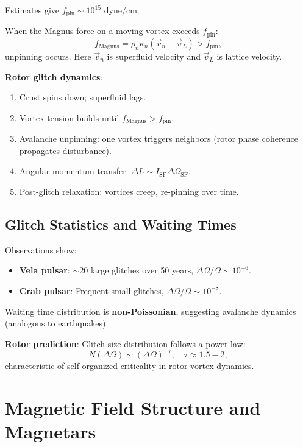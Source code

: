 \documentclass[12pt,a4paper]{article}
\theoremstyle{definition}
\theoremstyle{remark}
\begin{document}
Estimates give $f_{\text{pin}} \sim 10^{15}$ dyne/cm.

When the Magnus force on a moving vortex exceeds $f_{\text{pin}}$:
\begin{equation}
f_{\text{Magnus}} = \rho_n \kappa_n (\vec{v}_n - \vec{v}_L) > f_{\text{pin}},
\end{equation}
unpinning occurs. Here $\vec{v}_n$ is superfluid velocity and $\vec{v}_L$ is lattice velocity.

\textbf{Rotor glitch dynamics}:
\begin{enumerate}
\item Crust spins down; superfluid lags.
\item Vortex tension builds until $f_{\text{Magnus}} > f_{\text{pin}}$.
\item Avalanche unpinning: one vortex triggers neighbors (rotor phase coherence propagates disturbance).
\item Angular momentum transfer: $\Delta L \sim I_{\text{SF}} \Delta \Omega_{\text{SF}}$.
\item Post-glitch relaxation: vortices creep, re-pinning over time.
\end{enumerate}

\subsection{Glitch Statistics and Waiting Times}

Observations show:
\begin{itemize}
\item \textbf{Vela pulsar}: $\sim 20$ large glitches over 50 years, $\Delta \Omega/\Omega \sim 10^{-6}$.
\item \textbf{Crab pulsar}: Frequent small glitches, $\Delta \Omega/\Omega \sim 10^{-8}$.
\end{itemize}

Waiting time distribution is \textbf{non-Poissonian}, suggesting avalanche dynamics (analogous to earthquakes).

\textbf{Rotor prediction}: Glitch size distribution follows a power law:
\begin{equation}
N(\Delta \Omega) \sim (\Delta \Omega)^{-\tau}, \quad \tau \approx 1.5-2,
\end{equation}
characteristic of self-organized criticality in rotor vortex dynamics.

\section{Magnetic Field Structure and Magnetars}
\end{document}
